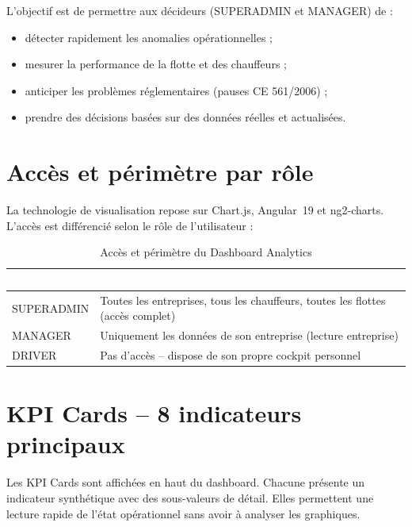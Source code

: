 \documentclass[12pt,a4paper]{report}
\newcommand{\thead}[1]{\cellcolor{tablehead}\textcolor{white}{\textbf{#1}}}
\begin{document}
L'objectif est de permettre aux décideurs (SUPERADMIN et MANAGER) de :
\begin{itemize}
  \item détecter rapidement les anomalies opérationnelles ;
  \item mesurer la performance de la flotte et des chauffeurs ;
  \item anticiper les problèmes réglementaires (pauses CE 561/2006) ;
  \item prendre des décisions basées sur des données réelles et actualisées.
\end{itemize}

\section{Accès et périmètre par rôle}
\label{sec:ch8-acces}

La technologie de visualisation repose sur Chart.js, Angular~19 et
ng2-charts. L'accès est différencié selon le rôle de l'utilisateur :

\begin{table}[H]
  \centering
  \caption{Accès et périmètre du Dashboard Analytics}
  \label{tab:kpi_acces}
  \begin{tabularx}{\textwidth}{|l|Y|}
    \hline
    \thead{Rôle} & \thead{Périmètre des données} \\
    \hline
    SUPERADMIN & Toutes les entreprises, tous les chauffeurs, toutes les flottes (accès complet) \\
    MANAGER & Uniquement les données de son entreprise (lecture entreprise) \\
    DRIVER & Pas d'accès -- dispose de son propre cockpit personnel \\
    \hline
  \end{tabularx}
\end{table}

\section{KPI Cards -- 8 indicateurs principaux}
\label{sec:ch8-kpicards}

Les KPI Cards sont affichées en haut du dashboard. Chacune présente un
indicateur synthétique avec des sous-valeurs de détail. Elles permettent
une lecture rapide de l'état opérationnel sans avoir à analyser les
graphiques.
\end{document}
